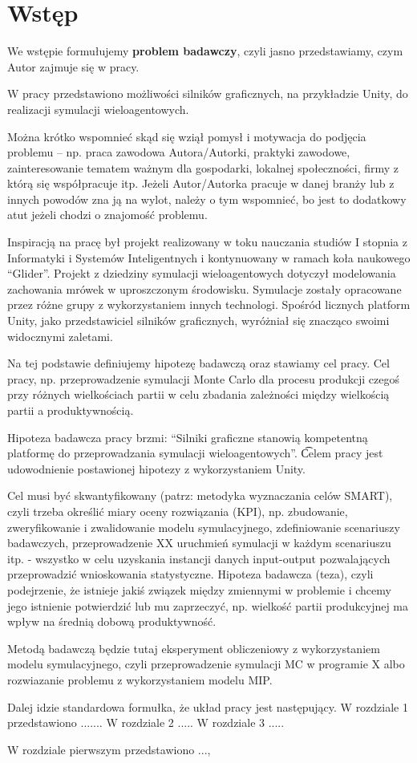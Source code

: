 \section*{Wstęp} 

We wstępie formułujemy \textbf{problem badawczy}, czyli jasno przedstawiamy, czym Autor zajmuje się w pracy.

W pracy przedstawiono możliwości silników graficznych, na przykładzie Unity, do realizacji symulacji wieloagentowych.

Można krótko wspomnieć skąd się wziął pomysł i motywacja do podjęcia problemu -- np. praca zawodowa Autora/Autorki, praktyki zawodowe, zainteresowanie tematem ważnym dla gospodarki, lokalnej społeczności, firmy z którą się współpracuje itp. Jeżeli Autor/Autorka pracuje w danej branży lub z innych powodów zna ją na wylot, należy o tym wspomnieć, bo jest to dodatkowy atut jeżeli chodzi o znajomość problemu. 

Inspiracją na pracę był projekt realizowany w toku nauczania studiów I stopnia z Informatyki i Systemów Inteligentnych i kontynuowany w ramach koła naukowego ``Glider''. Projekt z dziedziny symulacji wieloagentowych dotyczył modelowania zachowania mrówek w uproszczonym środowisku. Symulacje zostały opracowane przez różne grupy z wykorzystaniem innych technologi. Spośród licznych platform Unity, jako przedstawiciel silników graficznych, wyróżniał się znacząco swoimi widocznymi zaletami.

Na tej podstawie definiujemy hipotezę badawczą oraz stawiamy cel pracy. Cel pracy, np. przeprowadzenie symulacji Monte Carlo dla procesu produkcji czegoś przy różnych wielkościach partii w celu zbadania zależności między wielkością partii a produktywnością.

Hipoteza badawcza pracy brzmi: ``Silniki graficzne stanowią kompetentną platformę do przeprowadzania symulacji wieloagentowych''. \t Celem pracy jest udowodnienie postawionej hipotezy z wykorzystaniem Unity.

Cel musi być skwantyfikowany (patrz: metodyka wyznaczania celów SMART), czyli trzeba określić miary oceny rozwiązania (KPI), np. zbudowanie, zweryfikowanie i zwalidowanie modelu symulacyjnego, zdefiniowanie scenariuszy badawczych, przeprowadzenie XX uruchmień symulacji w każdym scenariuszu itp. - wszystko w celu uzyskania instancji danych input-output pozwalających przeprowadzić wnioskowania statystyczne.
Hipoteza badawcza (teza), czyli podejrzenie, że istnieje jakiś związek między zmiennymi w problemie i chcemy jego istnienie potwierdzić lub mu zaprzeczyć, np. wielkość partii produkcyjnej ma wpływ na średnią dobową produktywność. 

Metodą badawczą będzie tutaj eksperyment obliczeniowy z wykorzystaniem modelu symulacyjnego, czyli przeprowadzenie symulacji MC w programie X albo rozwiazanie problemu z wykorzystaniem modelu MIP.

Dalej idzie standardowa formułka, że układ pracy jest następujący. W rozdziale 1 przedstawiono ....... W rozdziale 2 ..... W rozdziale 3 .....

W rozdziale pierwszym przedstawiono ...,